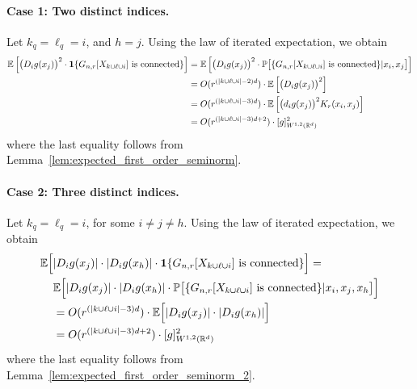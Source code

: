 \documentclass{article}
\newcommand{\Reals}{\mathbb{R}}
\newcommand{\1}{\mathbf{1}}
\newcommand{\Rd}{\Reals^d}
\newcommand{\Pbb}{\mathbb{P}}
\newcommand{\Ebb}{\mathbb{E}}
\theoremstyle{alden}
\theoremstyle{aldenthm}
\theoremstyle{definition}
\theoremstyle{remark}
\begin{document}
\paragraph{Case 1: Two distinct indices.}
Let $k_q = \ell_q = i$, and $h = j$. Using the law of iterated expectation, we obtain
\begin{align*}
\Ebb \left[\bigl(D_{i}g(x_j)\bigr)^2 \cdot \1\{G_{n,r}[X_{k \cup \ell \cup i}] ~\textrm{is connected} \}\right] &= \Ebb \left[\bigl(D_{i}g(x_j)\bigr)^2 \cdot \Pbb\bigl[\{G_{n,r}[X_{k \cup \ell \cup i}] ~\textrm{is connected} \} |x_i,x_j\bigr]\right] \\
& = O(r^{(\abs{k \cup \ell \cup i} - 2)d}) \cdot \Ebb\left[\bigl(D_{i}g(x_j)\bigr)^2\right] \\
& = O(r^{(\abs{k \cup \ell \cup i} - 3)d}) \cdot \Ebb\left[\bigl(d_{i}g(x_j)\bigr)^2K_r(x_i,x_j)\right] \\
& = O(r^{(\abs{k \cup \ell \cup i} - 3)d + 2}) \cdot [g]_{W^{1,2}(\Rd)}^2
\end{align*}
where the last equality follows from Lemma~\ref{lem:expected_first_order_seminorm}.
\paragraph{Case 2: Three distinct indices.}
Let $k_q = \ell_q = i$, for some $i \neq j \neq h$. Using the law of iterated expectation, we obtain
\begin{align*}
\Ebb \Bigl[ & \abs{D_{i}g(x_j)} \cdot \abs{D_ig(x_h)} \cdot \1\{G_{n,r}[X_{k \cup \ell \cup i}] ~\textrm{is connected} \}\Bigr] = \nonumber \\
& \Ebb\Bigl[\abs{D_{i}g(x_j)} \cdot \abs{D_ig(x_h)} \cdot \Pbb\bigl[\{G_{n,r}[X_{k \cup \ell \cup i}] ~\textrm{is connected} \} |x_i,x_j,x_h\bigr]\Bigr] \nonumber \\
& = O(r^{(\abs{k \cup \ell \cup i} - 3)d}) \cdot \Ebb\Bigl[\abs{D_{i}g(x_j)} \cdot \abs{D_ig(x_h)} \Bigr] \nonumber \\
& = O(r^{(\abs{k \cup \ell \cup i} - 3)d + 2})\cdot[g]_{W^{1,2}(\Rd)}^2
\end{align*}
where the last equality follows from Lemma~\ref{lem:expected_first_order_seminorm_2}.
\end{document}
